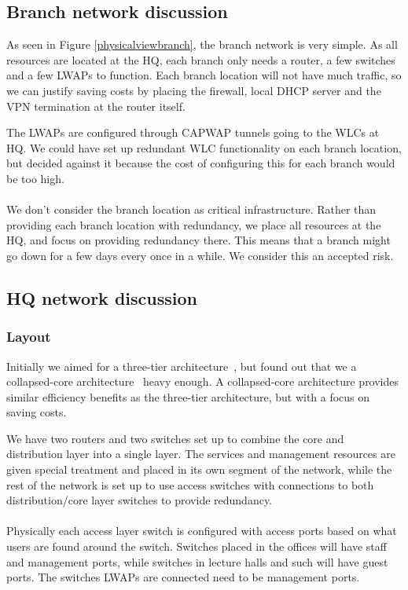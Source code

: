 
\subsection{Branch network discussion}


As seen in Figure \ref{physicalviewbranch}, the branch network is very simple. As all resources are located at the HQ, each branch only needs a router, a few switches and a few LWAPs to function. Each branch location will not have much traffic, so we can justify saving costs by placing the firewall, local DHCP server and the VPN termination at the router itself.

The LWAPs are configured through CAPWAP tunnels going to the WLCs at HQ. We could have set up redundant WLC functionality on each branch location, but decided against it because the cost of configuring this for each branch would be too high.
\\
\\
We don't consider the branch location as critical infrastructure. Rather than providing each branch location with redundancy, we place all resources at the HQ, and focus on providing redundancy there. This means that a branch might go down for a few days every once in a while. We consider this an accepted risk.

\subsection{HQ network discussion}

\subsubsection{Layout}

Initially we aimed for a three-tier architecture~\cite{todo}, but found out that we a collapsed-core architecture~\cite{todo} heavy enough. A collapsed-core architecture provides similar efficiency benefits as the three-tier architecture, but with a focus on saving costs.

We have two routers and two switches set up to combine the core and distribution layer into a single layer. The services and management resources are given special treatment and placed in its own segment of the network, while the rest of the network is set up to use access switches with connections to both distribution/core layer switches to provide redundancy.
\\
\\
Physically each access layer switch is configured with access ports based on what users are found around the switch. Switches placed in the offices will have staff and management ports, while switches in lecture halls and such will have guest ports. The switches LWAPs are connected need to be management ports. 

